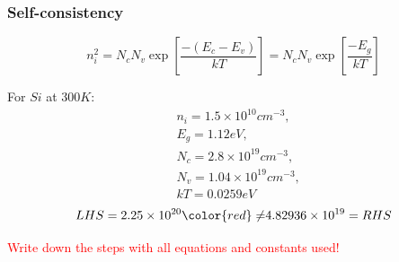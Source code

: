\documentclass{beamer}
\begin{document}
    \begin{frame}[t] \frametitle{Self-consistency}
        \begin{equation*}
            n_i^2 = N_cN_v \exp \left[ \frac{-(E_c - E_v)}{kT}  \right] = N_c N_v \exp \left[ \frac{-E_g}{kT}  \right]
        \end{equation*}
        \vspace{2em}
        \par For $Si$ at $300K$:
        \begin{equation*}
            \begin{aligned}
                &n_i = 1.5 \times 10^{10} cm^{-3},\\ &E_g = 1.12 eV, \\ 
                &N_c = 2.8 \times 10^{19} cm^{-3},\\ &N_v = 1.04 \times 10^{19} cm^{-3},\\ &kT = 0.0259 eV
            \end{aligned}
        \end{equation*}
        \begin{equation*}
            LHS = 2.25 \times 10^{20} {\color{red} \neq } 4.82936 \times 10^{19} = RHS  
        \end{equation*}

        \begin{center}
            \textcolor{red}{Write down the steps with all equations and constants used!} 
        \end{center}
    \end{frame}
\end{document}
